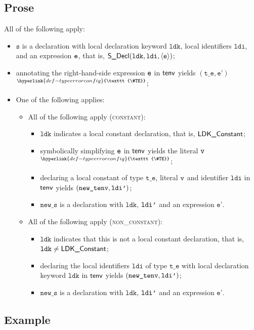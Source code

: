 \documentclass{book}
\newcommand\TypeErrorConfig[0]{\hyperlink{def-typeerrorconfig}{\texttt{\#TE}}}
\newcommand\ProseOrTypeError[0]{\hyperlink{def-proseortypeerror}{$^{\TypeErrorConfig}$}}
\newcommand\newtenv[0]{\texttt{new\_tenv}}
\newcommand\vte[0]{\texttt{t\_e}}
\newcommand\vs[0]{\texttt{s}}
\newcommand\ldi[0]{\texttt{ldi}}
\newcommand\ldk[0]{\texttt{ldk}}
\newcommand\news[0]{\texttt{new\_s}}
\newcommand\vep[0]{\texttt{e'}}
\begin{document}
\subsection{Prose}
All of the following apply:
\begin{itemize}
  \item $\vs$ is a declaration with local declaration keyword $\ldk$, local identifiers $\ldi$, and an expression $\texttt{e}$,
        that is, $\SDecl(\ldk, \ldi, \langle\ve\rangle)$;
  \item annotating the right-hand-side expression $\texttt{e}$ in $\textsf{tenv}$ yields $(\vte,\vep)$ \ProseOrTypeError;
  \item One of the following applies:
  \begin{itemize}
    \item All of the following apply (\textsc{constant}):
    \begin{itemize}
      \item $\ldk$ indicates a local constant declaration, that is, $\textsf{LDK\_Constant}$;
      \item symbolically simplifying $\texttt{e}$ in $\textsf{tenv}$ yields the literal $\texttt{v}$ \ProseOrTypeError;
      \item declaring a local constant of type $\vte$, literal $\texttt{v}$ and identifier $\ldi$ in $\textsf{tenv}$ yields $(\newtenv, \ldip)$;
      \item $\news$ is a declaration with $\ldk$, $\texttt{ldi'}$ and an expression $\vep$.
    \end{itemize}

    \item All of the following apply (\textsc{non\_constant}):
    \begin{itemize}
      \item $\ldk$ indicates that this is not a local constant declaration, that is, $\ldk\neq\LDKConstant$;
      \item declaring the local identifiers $\ldi$ of type $\vte$ with local declaration keyword $\ldk$ in $\textsf{tenv}$
            yields $(\newtenv, \ldip)$;
      \item $\news$ is a declaration with $\ldk$, $\texttt{ldi'}$ and an expression $\vep$.
    \end{itemize}
  \end{itemize}
\end{itemize}

\subsection{Example}
\end{document}
